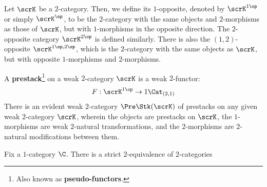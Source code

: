             \begin{convention} \label{conv: 1_opposite_and_2_opposite_categories}
                Let $\scrK$ be a $2$-category. Then, we define its $1$-opposite, denoted by $\scrK^{1\-\op}$ or simply $\scrK^{\op}$, to be the $2$-category with the same objects and $2$-morphisms as those of $\scrK$, but with $1$-morphisms in the opposite direction. The $2$-opposite category $\scrK^{2\-\op}$ is defined similarly. There is also the $(1, 2)$-opposite $\scrK^{1\-\op, 2\-\op}$, which is the $2$-category with the same objects as $\scrK$, but with opposite $1$-morphisms and $2$-morphisms.
            \end{convention}
            \begin{definition}[Prestacks] \label{def: prestacks}
                A \textbf{prestack}\footnote{Also known as \textbf{pseudo-functors}.} on a weak $2$-category $\scrK$ is a weak $2$-functor:
                    $$F: \scrK^{1\-\op} \to 1\-\Cat_{(2, 1)}$$
                There is an evident weak $2$-category $\Pre\Stk(\scrK)$ of prestacks on any given weak $2$-category $\scrK$, wherein the objects are prestacks on $\scrK$, the $1$-morphisms are weak $2$-natural transformations, and the $2$-morphisms are $2$-natural modifications between them.
            \end{definition}
            \begin{theorem} \label{theorem: grothendieck_construction}
                Fix a $1$-category $\C$. There is a strict $2$-equivalence of $2$-categories
            \end{theorem}
            
